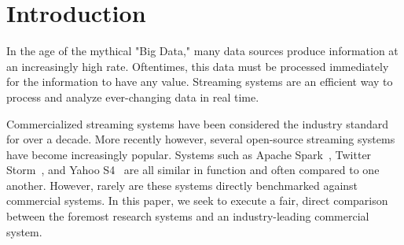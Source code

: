 \section{Introduction} 
In the age of the mythical "Big Data," many data sources
produce information at an increasingly high rate.  Oftentimes, this data must
be processed immediately for the information to have any value.  Streaming
systems are an efficient way to process and analyze ever-changing data in real
time.  

Commercialized streaming systems have been considered the industry standard for
over a decade.  More recently however, several open-source streaming systems
have become increasingly popular.  Systems such as Apache
Spark~\cite{dstreams}, Twitter Storm~\cite{storm}, and Yahoo S4~\cite{s4} are
all similar in function and often compared to one another.  However, rarely are
these systems directly benchmarked against commercial systems.  In this paper,
we seek to execute a fair, direct comparison between the foremost research
systems and an industry-leading commercial system.

